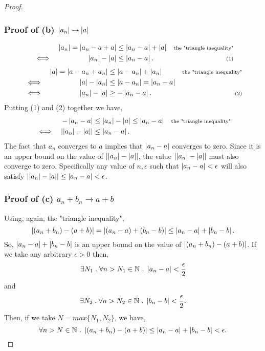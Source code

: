 \documentclass[MathsNotesBase.tex]{subfiles}
\begin{document}
{\begin{proof}
			\subsubsection{Proof of (b) $ \left\lvert a_n\right\rvert \to \left\lvert a\right\rvert $} 
			\begin{align*}
			&& \left\lvert a_n\right\rvert = \left\lvert a_n - a + a\right\rvert &\leq \left\lvert a_n - a\right\rvert + \left\lvert a\right\rvert  &\text{\scriptsize{the "triangle inequality"}}\\
			&\iff & \left\lvert a_n\right\rvert - \left\lvert a\right\rvert &\leq \left\lvert a_n - a\right\rvert. &\text{\scriptsize{(1)}} \\
			\end{align*}
			\begin{align*}
			&& \left\lvert a\right\rvert = \left\lvert a - a_n + a_n\right\rvert &\leq \left\lvert a - a_n\right\rvert + \left\lvert a_n\right\rvert  &\text{\scriptsize{the "triangle inequality"}}\\
			&\iff & \left\lvert a\right\rvert - \left\lvert a_n\right\rvert &\leq \left\lvert a - a_n\right\rvert = \left\lvert a_n - a\right\rvert &\text{\scriptsize{}} \\
			&\iff & \left\lvert a_n\right\rvert - \left\lvert a\right\rvert &\geq -\left\lvert a_n - a\right\rvert. &\text{\scriptsize{(2)}} \\
			\end{align*}
			Putting (1) and (2) together we have,
			\begin{align*}
			&& -\left\lvert a_n - a\right\rvert &\leq \left\lvert a_n\right\rvert - \left\lvert a\right\rvert \leq \left\lvert a_n - a\right\rvert &\text{\scriptsize{the "triangle inequality"}}\\
			&\iff & \left\lvert\left\lvert a_n\right\rvert - \left\lvert a\right\rvert\right\rvert &\leq \left\lvert a_n - a\right\rvert. \\
			\end{align*}
			The fact that $a_n$ converges to $a$ implies that $ \left\lvert a_n - a\right\rvert $ converges to zero. Since it is an upper bound on the value of ${ \left\lvert\left\lvert a_n\right\rvert - \left\lvert a\right\rvert\right\rvert }$, the value ${ \left\lvert\left\lvert a_n\right\rvert - \left\lvert a\right\rvert\right\rvert }$ must also converge to zero. Specifically any value of $ n, \epsilon $ such that ${ \left\lvert a_n - a\right\rvert < \epsilon }$ will also satisfy ${ \left\lvert\left\lvert a_n\right\rvert - \left\lvert a\right\rvert\right\rvert \leq \left\lvert a_n - a\right\rvert < \epsilon }$.
			
			\subsubsection{Proof of (c) $ a_n + b_n \to a + b $}
			Using, again, the "triangle inequality",
			\[ \left\lvert(a_n + b_n) - (a + b)\right\rvert = \left\lvert(a_n - a) + (b_n - b)\right\rvert \leq \left\lvert a_n - a\right\rvert + \left\lvert b_n - b\right\rvert. \]
			So, ${ \left\lvert a_n - a\right\rvert + \left\lvert b_n - b\right\rvert }$ is an upper bound on the value of ${ \left\lvert(a_n + b_n) - (a + b)\right\rvert }$. If we take any arbitrary ${ \epsilon > 0 }$ then,
			\[ \exists N_1 \;.\; \forall n > N_1 \in \mathbb{N}^{} \;.\; \left\lvert a_n - a\right\rvert < \frac{\epsilon}{2} \]
			and
			\[ \exists N_2 \;.\; \forall n > N_2 \in \mathbb{N}^{} \;.\; \left\lvert b_n - b\right\rvert < \frac{\epsilon}{2}. \]
			Then, if we take $ N = max\{N_1, N_2\} $, we have,
			\[ \forall n > N \in \mathbb{N}^{} \;.\; \left\lvert(a_n + b_n) - (a + b)\right\rvert \leq \left\lvert a_n - a\right\rvert + \left\lvert b_n - b\right\rvert < \epsilon. \]
			

\end{proof}}
\end{document}
